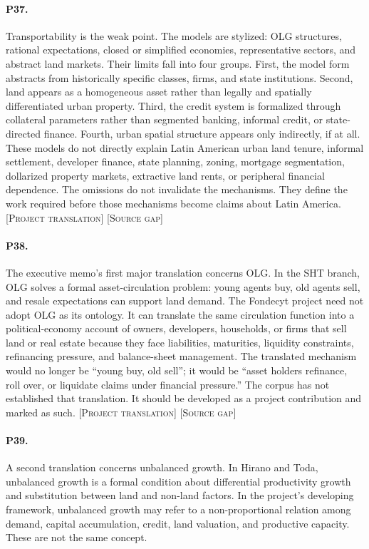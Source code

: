 \documentclass[11pt]{article}
\newcommand{\projecttranslation}{\textsc{[Project translation]}}
\newcommand{\sourcegap}{\textsc{[Source gap]}}
\begin{document}
\paragraph{P37.} Transportability is the weak point. The models are stylized: OLG structures, rational expectations, closed or simplified economies, representative sectors, and abstract land markets. Their limits fall into four groups. First, the model form abstracts from historically specific classes, firms, and state institutions. Second, land appears as a homogeneous asset rather than legally and spatially differentiated urban property. Third, the credit system is formalized through collateral parameters rather than segmented banking, informal credit, or state-directed finance. Fourth, urban spatial structure appears only indirectly, if at all. These models do not directly explain Latin American urban land tenure, informal settlement, developer finance, state planning, zoning, mortgage segmentation, dollarized property markets, extractive land rents, or peripheral financial dependence. The omissions do not invalidate the mechanisms. They define the work required before those mechanisms become claims about Latin America. \projecttranslation{} \sourcegap{}

\paragraph{P38.} The executive memo's first major translation concerns OLG. In the SHT branch, OLG solves a formal asset-circulation problem: young agents buy, old agents sell, and resale expectations can support land demand. The Fondecyt project need not adopt OLG as its ontology. It can translate the same circulation function into a political-economy account of owners, developers, households, or firms that sell land or real estate because they face liabilities, maturities, liquidity constraints, refinancing pressure, and balance-sheet management. The translated mechanism would no longer be ``young buy, old sell''; it would be ``asset holders refinance, roll over, or liquidate claims under financial pressure.'' The corpus has not established that translation. It should be developed as a project contribution and marked as such. \projecttranslation{} \sourcegap{}

\paragraph{P39.} A second translation concerns unbalanced growth. In Hirano and Toda, unbalanced growth is a formal condition about differential productivity growth and substitution between land and non-land factors. In the project's developing framework, unbalanced growth may refer to a non-proportional relation among demand, capital accumulation, credit, land valuation, and productive capacity. These are not the same concept.
\end{document}
